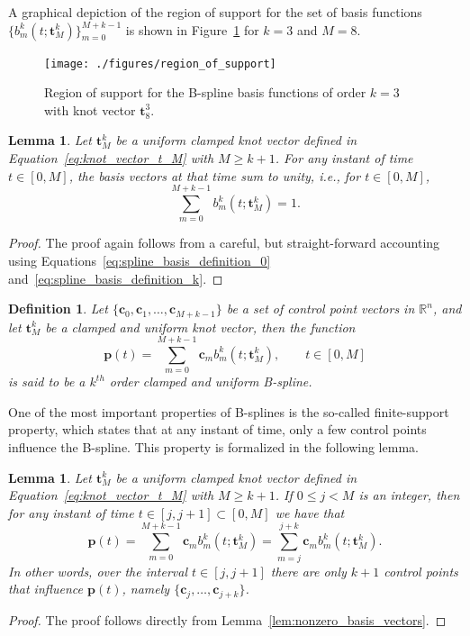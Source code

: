 \documentclass{article}
\newtheorem{lemma}[theorem]{Lemma}
\newtheorem{definition}[theorem]{Definition}
\newcommand{\cbf}{\mathbf{c}}
\begin{document}
A graphical depiction of the region of support for the set of basis functions $\{b_m^k(t;\mathbf{t}_M^k)\}_{m=0}^{M+k-1}$ is shown in Figure~\ref{fig:region_of_support} for $k=3$ and $M=8$.
\begin{figure}[hbt]
  \centering\texttt{[image: ./figures/region\_of\_support]}
  \caption{Region of support for the B-spline basis functions of order $k=3$ with knot vector $\mathbf{t}_8^3$.}
  \label{fig:region_of_support}  
\end{figure}

\begin{lemma} \label{lem:basis_vectors_sum_to_1}
	Let $\mathbf{t}_M^k$ be a uniform clamped knot vector defined in Equation~\eqref{eq:knot_vector_t_M} with $M\geq k+1$. For any instant of time $t\in[0,M]$, the basis vectors at that time sum to unity, i.e., for $t\in[0, M]$,
	\[
	\sum_{m=0}^{M+k-1} b_m^k(t; \mathbf{t}_M^k) = 1.
	\]
\end{lemma}
\begin{proof}  The proof again follows from a careful, but straight-forward accounting using Equations~\eqref{eq:spline_basis_definition_0} and~\eqref{eq:spline_basis_definition_k}.	
\end{proof}

\begin{definition}
Let $\{\cbf_0, \cbf_1, \dots, \cbf_{M+k-1}\}$ be a set of control point vectors in $\mathbb{R}^n$, and let $\mathbf{t}_M^k$ be a clamped and uniform knot vector, then the function 
\begin{equation}\label{eq:clamped_uniform_spline}
\mathbf{p}(t) = \sum_{m=0}^{M+k-1} \cbf_m b_m^k(t; \mathbf{t}_M^k), \qquad t\in[0, M]
\end{equation}
is said to be a $k^{th}$ order clamped and uniform B-spline. 
\end{definition}

One of the most important properties of B-splines is the so-called finite-support property, which states that at any instant of time, only a few control points influence the B-spline.  This property is formalized in the following lemma.
\begin{lemma}\label{lem:finite_num_control_points}
	Let $\mathbf{t}_M^k$ be a uniform clamped knot vector defined in Equation~\eqref{eq:knot_vector_t_M} with $M\geq k+1$. If $0\leq j < M$ is an integer, then for any instant of time $t\in[j, j+1]\subset [0, M]$ we have that
	\[
	\mathbf{p}(t) = \sum_{m=0}^{M+k-1} \cbf_m b_m^k(t; \mathbf{t}_M^k) = \sum_{m=j}^{j+k} \cbf_m b_m^k(t; \mathbf{t}_M^k).
	\]
	In other words, over the interval $t\in[j, j+1]$ there are only $k+1$ control points that influence $\mathbf{p}(t)$, namely
	$\{\cbf_j, \dots, \cbf_{j+k}\}$.
\end{lemma}
\begin{proof}
The proof follows directly from Lemma~\ref{lem:nonzero_basis_vectors}.	
\end{proof}
\end{document}
